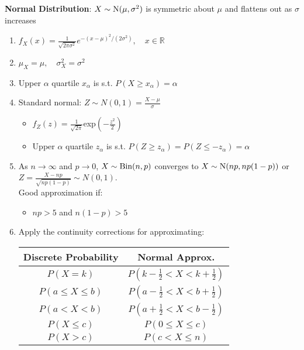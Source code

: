 \documentclass[12pt, a4paper]{article}
\begin{document}
\begin{multicols*}{3}
\textbf{Normal Distribution}: $ X \sim \text{N}(\mu, \sigma^2)$ is symmetric about $\mu$ and flattens out as $\sigma$ increases
\begin{enumerate}[\roman*.]
  \item $ f_X(x) = \frac{1}{\sqrt{2\pi \sigma^2}} e^{-(x - \mu)^2 /(2\sigma^2)},\quad x \in \mathbb{R} $
  \item $ \mu_X = \mu,\quad \sigma^2_X = \sigma^2 $
  \item Upper $\alpha$ quartile $x_{\alpha}$ is s.t. $P(X \geq x_{\alpha}) = \alpha$ 
  \item Standard normal: $ Z \sim N(0, 1) = \frac{X-\mu}{\sigma}$
    \begin{itemize}[leftmargin=*]\vspace{3pt }
      \item $f_Z(z) = \frac{1}{\sqrt{2\pi}}$exp$(-\frac{z^2}{2})$
      \item Upper $\alpha$ quartile $z_{\alpha}$ is s.t. $P(Z \geq z_{\alpha}) = P(Z \leq -z_{\alpha}) = \alpha$ 
    \end{itemize}
  \item As $n\rightarrow \infty$ and $p\rightarrow 0$, $X \sim \text{Bin}(n, p)$ converges to $X \sim \text{N}(np, np(1-p))$ or $Z = \frac{X-np}{\sqrt{np(1-p)}} \sim N(0, 1)$.\\Good approximation if:
    \begin{itemize}[leftmargin=*]\vspace{3pt }
      \item $np>5$ and $n(1-p)>5$
    \end{itemize}
  \item Apply the continuity corrections for approximating:\\\vspace{1em}
    \begin{tabular}{|c|c|}
      \hline
      \textbf{Discrete Probability} & \textbf{Normal Approx.} \\
      \hline
      \( P(X = k) \) & \( P\left(k - \frac{1}{2} < X < k + \frac{1}{2}\right) \) \\
      \hline
      \( P(a \leq X \leq b) \) & \( P\left(a - \frac{1}{2} < X < b + \frac{1}{2}\right) \) \\
      \hline
      \( P(a < X < b) \) & \( P\left(a + \frac{1}{2} < X < b - \frac{1}{2}\right) \) \\
      \hline
      \( P(X \leq c) \) & \( P\left( 0 \leq X \leq c \right) \) \\
      \hline
      \( P(X > c) \) & \( P\left(c < X \leq n\right) \) \\
      \hline
      \end{tabular}
\end{enumerate}


\end{multicols*}
\end{document}
